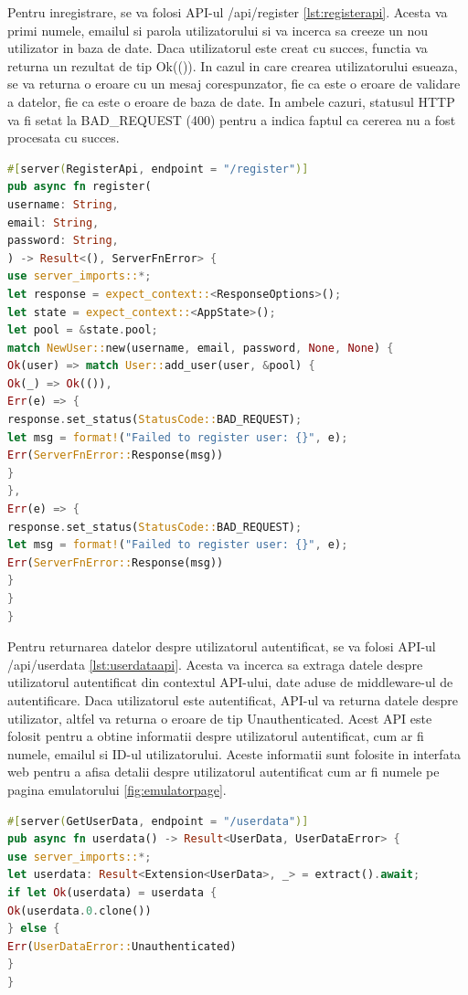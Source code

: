 \documentclass[titlepage,12pt]{article}
\DeclareRobustCommand{\code}[1]{{\ttfamily\small #1}}
\begin{document}
Pentru inregistrare, se va folosi API-ul \code{/api/register} \cref{lst:registerapi}. Acesta va primi numele, emailul si parola utilizatorului si va incerca sa creeze un nou utilizator in baza de date. Daca utilizatorul este creat cu succes, functia va returna un rezultat de tip \code{Ok(())}. In cazul in care crearea utilizatorului esueaza, se va returna o eroare cu un mesaj corespunzator, fie ca este o eroare de validare a datelor, fie ca este o eroare de baza de date. In ambele cazuri, statusul HTTP va fi setat la \code{BAD\_REQUEST (400)} pentru a indica faptul ca cererea nu a fost procesata cu succes.

\begin{lstlisting}[language=Rust,caption={API pentru inregistrare},label={lst:registerapi}]
#[server(RegisterApi, endpoint = "/register")]
pub async fn register(
username: String,
email: String,
password: String,
) -> Result<(), ServerFnError> {
use server_imports::*;
let response = expect_context::<ResponseOptions>();
let state = expect_context::<AppState>();
let pool = &state.pool;
match NewUser::new(username, email, password, None, None) {
Ok(user) => match User::add_user(user, &pool) {
Ok(_) => Ok(()),
Err(e) => {
response.set_status(StatusCode::BAD_REQUEST);
let msg = format!("Failed to register user: {}", e);
Err(ServerFnError::Response(msg))
}
},
Err(e) => {
response.set_status(StatusCode::BAD_REQUEST);
let msg = format!("Failed to register user: {}", e);
Err(ServerFnError::Response(msg))
}
}
}
\end{lstlisting}

Pentru returnarea datelor despre utilizatorul autentificat, se va folosi API-ul \code{/api/userdata} \cref{lst:userdataapi}. Acesta va incerca sa extraga datele despre utilizatorul autentificat din contextul API-ului, date aduse de middleware-ul de autentificare. Daca utilizatorul este autentificat, API-ul va returna datele despre utilizator, altfel va returna o eroare de tip \code{Unauthenticated}. Acest API este folosit pentru a obtine informatii despre utilizatorul autentificat, cum ar fi numele, emailul si ID-ul utilizatorului. Aceste informatii sunt folosite in interfata web pentru a afisa detalii despre utilizatorul autentificat cum ar fi numele pe pagina emulatorului \cref{fig:emulatorpage}.

\begin{lstlisting}[language=Rust,caption={API pentru obtinerea datelor despre utilizatorul autentificat},label={lst:userdataapi}]
#[server(GetUserData, endpoint = "/userdata")]
pub async fn userdata() -> Result<UserData, UserDataError> {
use server_imports::*;
let userdata: Result<Extension<UserData>, _> = extract().await;
if let Ok(userdata) = userdata {
Ok(userdata.0.clone())
} else {
Err(UserDataError::Unauthenticated)
}
}
\end{lstlisting}
\end{document}
